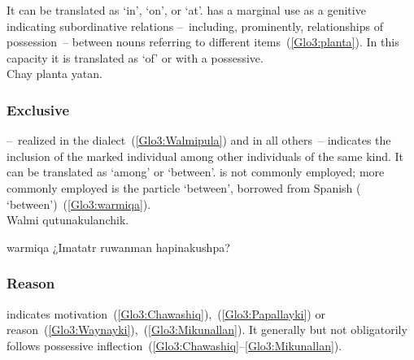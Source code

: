 \noindent
It can be translated as ‘in’, ‘on’, or ‘at’.  has a marginal use as a genitive indicating subordinative relations --~including, prominently, relationships of possession~-- between nouns referring to different items~(\ref{Glo3:planta}). In this capacity it is translated as ‘of’ or with a possessive.\\

%
{Chay planta yatan.}%
{}%
{}{}%

\subsubsection{Exclusive }
 --~realized  in the \CH{} dialect~(\ref{Glo3:Walmipula}) and  in all others~-- indicates the inclusion of the marked individual among other individuals of the same kind. It can be translated as ‘among’ or ‘between’.  is not commonly employed; more commonly employed is the particle  ‘between’, borrowed from Spanish ( ‘between’)~(\ref{Glo3:warmiqa}).\\

%
{Walmi qutunakulanchik.}%
{}%
{}{}%

%
{ warmiqa ¿Imatatr ruwanman hapinakushpa?}%
{}%
{}{}%

\subsubsection{Reason }
 indicates motivation~(\ref{Glo3:Chawashiq}),~(\ref{Glo3:Papallayki}) or reason~(\ref{Glo3:Waynayki}),~(\ref{Glo3:Mikunallan}). It generally but not obligatorily follows possessive inflection~(\ref{Glo3:Chawashiq}--\ref{Glo3:Mikunallan}).\\

